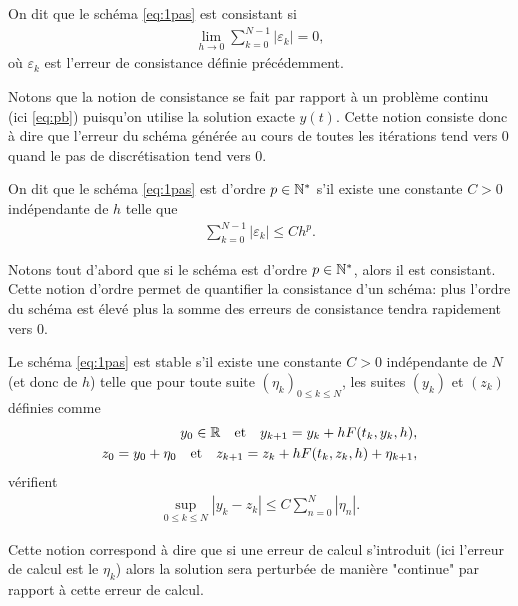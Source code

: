 \documentclass[12pt,a4paper,twoside]{article}
\begin{document}
\begin{definition}[Consistance]
  On dit que le sch\'ema \eqref{eq:1pas} est consistant si 
  \begin{align*}
    \lim_{h \to 0} \sum_{k=0}^{N-1} | \varepsilon_k | = 0 ,
  \end{align*}
  o\`u $\varepsilon_k$ est l'erreur de consistance d\'efinie pr\'ec\'edemment.
\end{definition}
Notons que la notion de consistance se fait par rapport \`a un probl\`eme continu
(ici \eqref{eq:pb}) puisqu'on utilise la solution exacte $y(t)$.
Cette notion consiste donc \`a dire que l'erreur du sch\'ema g\'en\'er\'ee
au cours de toutes les it\'erations tend vers 0 quand le pas de discr\'etisation
tend vers 0.



\begin{definition}[Ordre]
  On dit que le sch\'ema \eqref{eq:1pas} est d'ordre $p \in \mathbb{N}^*$ s'il existe
  une constante $C>0$ ind\'ependante de $h$ telle que
  \begin{align*}
    \sum_{k=0}^{N-1} | \varepsilon_k | \leq C h^{p} .
  \end{align*}
\end{definition}


Notons tout d'abord que si le sch\'ema est d'ordre $p \in \mathbb{N}^*$, alors il est consistant.
Cette notion d'ordre permet de quantifier la consistance d'un sch\'ema:
plus l'ordre du sch\'ema est \'elev\'e plus la somme des erreurs de consistance
tendra rapidement vers 0.


\begin{definition}[Stabilit\'e]
  Le sch\'ema \eqref{eq:1pas} est stable s'il existe une constante $C > 0$
  ind\'ependante de $N$ (et donc de $h$) telle que pour toute suite 
  $(\eta_k)_{0 \leq k \leq N}$, les suites $(y_k)$ et $(z_k)$ d\'efinies comme
  \begin{align*}
    y_0 \in \mathbb{R} \quad \text{et} \quad y_{k+1} = y_k + h F(t_k,y_k,h) ,
    \\
    z_0 = y_0 + \eta_0 \quad \text{et} \quad z_{k+1} = z_k + h F(t_k,z_k,h) + \eta_{k+1} ,
  \end{align*}
  v\'erifient
  \begin{align*}
    \sup_{0 \leq k \leq N} | y_k - z_k | \leq C \sum_{n=0}^N | \eta_n | .
  \end{align*}
\end{definition}

Cette notion correspond \`a dire que si une erreur de calcul s'introduit
(ici l'erreur de calcul est le $\eta_k$) alors la solution sera perturb\'ee
de mani\`ere "continue" par rapport \`a cette erreur de calcul.
\end{document}
